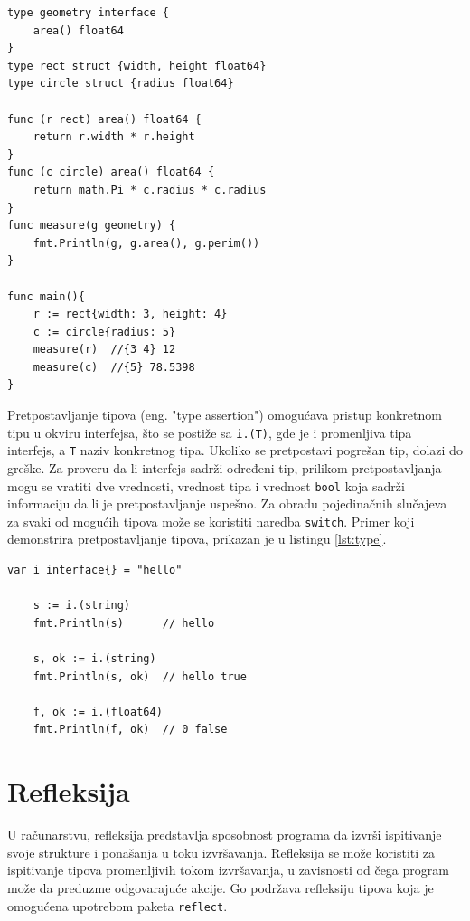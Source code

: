 \documentclass[12pt,oneside]{memoir}
\begin{document}
\begin{center}
\begin{lstlisting}[caption=Primer koji demonstrira rad sa interfejsima, label={lst:inter},  backgroundcolor=\color{background}]
type geometry interface { 
	area() float64 
}
type rect struct {width, height float64}
type circle struct {radius float64}

func (r rect) area() float64 {
	return r.width * r.height
}
func (c circle) area() float64 {
	return math.Pi * c.radius * c.radius
}
func measure(g geometry) {
	fmt.Println(g, g.area(), g.perim())
}

func main(){
	r := rect{width: 3, height: 4}	
	c := circle{radius: 5}			
	measure(r)	//{3 4} 12 
  	measure(c)	//{5} 78.5398 
}
\end{lstlisting}
\end{center}

Pretpostavljanje tipova (eng. "type assertion") omogućava pristup konkretnom tipu u okviru interfejsa, što se postiže sa \texttt{i.(T)}, gde je i promenljiva tipa interfejs, a \texttt{T} naziv konkretnog tipa. Ukoliko se pretpostavi pogrešan tip, dolazi do greške.  Za proveru da li interfejs sadrži određeni tip, prilikom pretpostavljanja mogu se vratiti dve vrednosti, vrednost tipa i vrednost \texttt{bool} koja sadrži informaciju da li je pretpostavljanje uspešno. Za obradu pojedinačnih slučajeva za svaki od mogućih tipova može se koristiti naredba \texttt{switch}.  Primer koji demonstrira pretpostavljanje tipova, prikazan je u listingu \ref{lst:type}.

\begin{center}
\begin{lstlisting}[caption=Primer koji demonstrira pretpostavljanje tipova kod interfejsa, label={lst:type},  backgroundcolor=\color{background}]
	var i interface{} = "hello"

	s := i.(string)
	fmt.Println(s) 		// hello

	s, ok := i.(string)
	fmt.Println(s, ok) 	// hello true

	f, ok := i.(float64)
	fmt.Println(f, ok) 	// 0 false
\end{lstlisting}
\end{center}


\section{Refleksija}

U računarstvu, refleksija predstavlja sposobnost programa da izvrši ispitivanje svoje strukture i ponašanja u toku izvršavanja. Refleksija se može koristiti za ispitivanje tipova promenljivih tokom izvršavanja, u zavisnosti od čega program može da preduzme odgovarajuće akcije. Go podržava refleksiju tipova koja je omogućena upotrebom paketa \texttt{reflect}.
\end{document}
